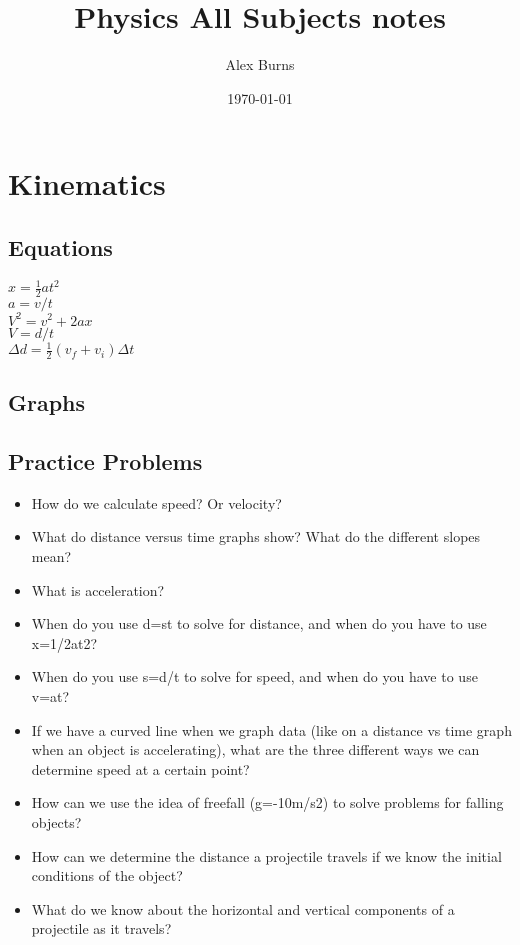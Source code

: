 \documentclass[11pt]{article}
\author{Alex Burns}
\date{\today}
\title{Physics All Subjects notes}
\begin{document}
\maketitle
\setcounter{tocdepth}{1}
\tableofcontents


\section*{Kinematics}
\label{sec:org7a8e614}
\subsection*{Equations}
\label{sec:orgbf2488c}
\(x=\frac12at^2\) \\
\(a=v/t\) \\
\(V^2=v^2+2ax\) \\
\(V=d/t\) \\
\(\Delta d=\frac12(v_f+v_i) \Delta t\) \\
\subsection*{Graphs}
\label{sec:org51c14a5}
\subsection*{Practice Problems}
\label{sec:org90ac3e4}
\begin{itemize}
\item How do we calculate speed? Or velocity?
\item What do distance versus time graphs show? What do the different slopes mean?
\item What is acceleration?
\item When do you use d=st to solve for distance, and when do you have to use x=1/2at2?
\item When do you use s=d/t to solve for speed, and when do you have to use v=at?
\item If we have a curved line when we graph data (like on a distance vs time graph when an object is accelerating), what are the three different ways we can determine speed at a certain point?
\item How can we use the idea of freefall (g=-10m/s2) to solve problems for falling objects?
\item How can we determine the distance a projectile travels if we know the initial conditions of the object?
\item What do we know about the horizontal and vertical components of a projectile as it travels?
\end{itemize}
\end{document}
